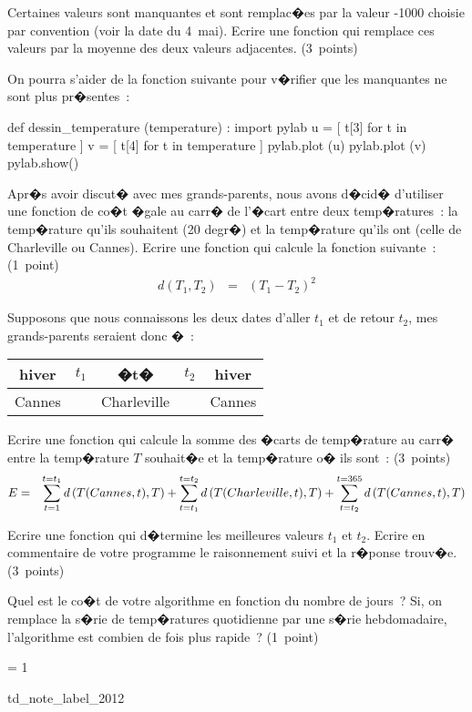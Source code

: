\begin{xexercice}
\exequest Certaines valeurs sont manquantes et sont remplac�es par la valeur -1000 choisie par convention (voir la date du 4~mai). Ecrire une fonction qui remplace ces valeurs par la moyenne des deux valeurs adjacentes. (3~points)

On pourra s'aider de la fonction suivante pour v�rifier que les manquantes ne sont plus pr�sentes~:

\begin{verbatimx}
def dessin_temperature (temperature) :
    import pylab
    u = [ t[3] for t in temperature ]
    v = [ t[4] for t in temperature ]
    pylab.plot (u)
    pylab.plot (v)
    pylab.show()
\end{verbatimx}
    

\exequest Apr�s avoir discut� avec mes grands-parents, nous avons d�cid� d'utiliser une fonction de co�t �gale au carr� de l'�cart entre deux temp�ratures~: la temp�rature qu'ils souhaitent (20 degr�) et la temp�rature qu'ils ont (celle de Charleville ou Cannes). Ecrire une fonction  qui calcule la fonction suivante~: (1~point)
\begin{eqnarray}
d(T_1,T_2)&=& (T_1-T_2)^2
\end{eqnarray}

\exequest Supposons que nous connaissons les deux dates d'aller $t_1$ et de retour $t_2$, mes grands-parents seraient donc �~:
\begin{center}\begin{tabular}{c|c|c|c|c} 
hiver & $t_1$ & �t� & $t_2$ & hiver \\ \hline
Cannes & & Charleville & & Cannes 
\end{tabular}\end{center}
Ecrire une fonction qui calcule la somme des �carts de temp�rature au carr� entre la temp�rature $T$ souhait�e et la temp�rature o� ils sont~: (3~points)
\begin{eqnarray}
E &=& \sum_{t=1}^{t=t_1} d\left(T(Cannes,t) , T\right) + \sum_{t=t_1}^{t=t_2} d\left(T(Charleville,t) , T\right)
      + \sum_{t=t_2}^{t=365} d\left(T(Cannes,t) , T\right)
\end{eqnarray}

\exequest Ecrire une fonction qui d�termine les meilleures valeurs $t_1$ et $t_2$. Ecrire en commentaire de votre programme le raisonnement suivi et la r�ponse trouv�e. (3~points)

\exequest Quel est le co�t de votre algorithme en fonction du nombre de jours~? Si, on remplace la s�rie de temp�ratures quotidienne par une s�rie hebdomadaire, l'algorithme est combien de fois plus rapide~? (1~point) 

\end{xexercice}



\ifnum\correctionenonce = 1

\begin{xdemoexonot}{td_note_label_2012}




\end{xdemoexonot}
\fi

%
